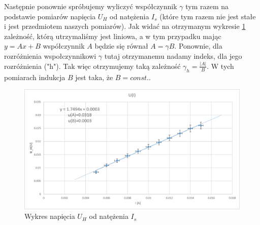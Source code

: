 \documentclass{article}
\begin{document}
\newpage

\par Następnie ponownie spróbujemy wyliczyć współczynnik $\gamma$ tym razem na podstawie pomiarów napięcia $U_{H}$ od natężenia $I_{s}$ (które tym razem nie jest stałe i jest przedmiotem naszych pomiarów). Jak widać na otrzymanym wykresie \ref{fig:Wykres 4} zależność, którą utrzymaliśmy jest liniowa, a w tym przypadku mając $y=Ax+B$ współczynnik $A$ będzie się równał $A=\gamma B$. Ponownie, dla rozróżnienia wspołczynnikowi $\gamma$ tutaj otrzymanemu nadamy indeks, dla jego rozróżnienia ("h"). Tak więc otrzymujemy taką zależność $\gamma_{h}=\frac{|A|}{B}$. W tych pomiarach indukcja $B$ jest taka, że $B=const.$.



\begin{figure}
    \centering
    \includegraphics{U_H_od_I.png}
    \caption{Wykres napięcia $U_{H}$ od natężenia $I_{s}$}
    \label{fig:Wykres 4}
\end{figure}
\end{document}
